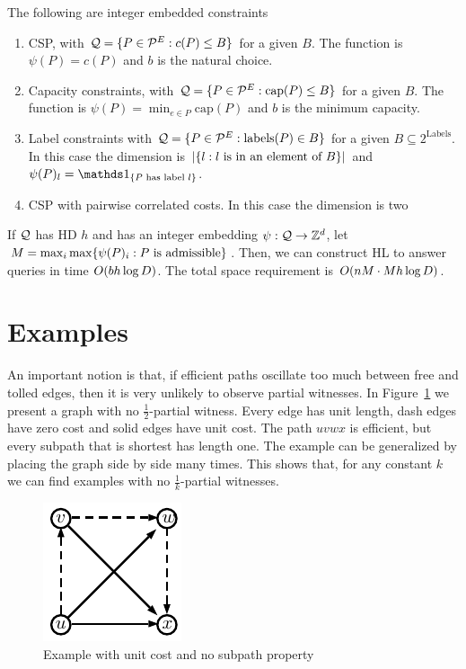 \documentclass[letterpaper,11pt]{article}
\begin{document}
\begin{proposition}
The following are integer embedded constraints 
\begin{enumerate}
\item CSP, with $\mathcal{Q}=\{P\in \mathcal{P}^E: c(P)\leq B\}$ for a given $B$. 
The function is $\psi(P)=c(P)$ and $b$ is the natural choice.
\item Capacity constraints, with $\mathcal{Q}=\{P\in \mathcal{P}^E: \text{cap}(P)\leq B\}$ for a given $B$.
The function is $\psi(P)=\min_{e\in P}\text{cap}(P)$ and $b$ is the minimum capacity.
\item Label constraints with $\mathcal{Q}=\{P\in \mathcal{P}^E: \text{labels}(P) \in B\}$ for a given $B\subseteq 2^{\text{Labels}}$.
In this case the dimension is $\lvert\{l:l\text{ is in an element of }B\}\rvert$ and $\psi(P)_l = \In{P \text{ has label }l}$.
\item CSP with pairwise correlated costs. In this case the dimension is two 
\end{enumerate}
\end{proposition}


\begin{proposition}
If $\mathcal{Q}$ has HD $h$ and has an integer embedding $\psi:\mathcal{Q}\to\mathbb{Z}^d$, let $M=\max_i\max\{\psi(P)_i:P \text{ is admissible}\}$.
Then, we can construct HL to answer queries in time $O(bh\log D)$.
The total space requirement is $O(nM\cdot Mh\log D)$.
\end{proposition}

\section{Examples}

An important notion is that, if efficient paths oscillate too much between free and tolled edges, then it is very unlikely to observe partial witnesses.
In Figure~\ref{fig:nosubpath} we present a graph with no $\frac{1}{2}$-partial witness.
Every edge has unit length, dash edges have zero cost and solid edges have unit cost.
The path $uvwx$ is efficient, but every subpath that is shortest has length one.
The example can be generalized by placing the graph side by side many times.
This shows that, for any constant $k$ we can find examples with no $\frac{1}{k}$-partial witnesses.


\begin{figure}
\caption{Example with unit cost and no subpath property}
\label{fig:nosubpath}
\centering
\includegraphics[scale=1.3]{TexImg/Nosubpath.pdf}
\end{figure}



\end{document}
